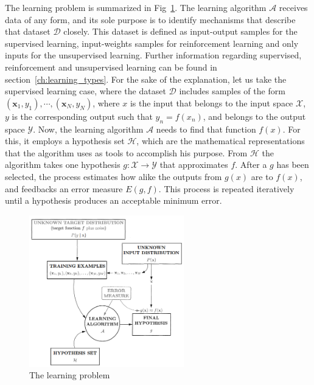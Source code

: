 The learning problem is summarized in Fig~\ref{fig:learning_problem}. The learning algorithm \( \mathcal{A} \) receives data of any form, and its sole purpose is to identify mechanisms that describe that dataset \( \mathcal{D} \) closely. This dataset is defined as input-output samples for the supervised learning, input-weights samples for reinforcement learning and only inputs for the unsupervised learning. Further information regarding supervised, reinforcement and unsupervised learning can be found in section~\ref{ch:learning_types}. For the sake of the explanation, let us take the supervised learning case, where the dataset  \( \mathcal{D} \) includes samples of the form \((\mathbf{x}_1, y_1),\cdots , (\mathbf{x}_N, y_N) \), where \(x\) is the input that belongs to the input space \( \mathcal{X} \), \(y\) is the corresponding output such that \(y_n = f(x_n)\), and belongs to the output space \( \mathcal{Y}\). Now, the learning algorithm \( \mathcal{A} \) needs to find that function \(f(x)\). For this, it employs a hypothesis set \( \mathcal{H} \), which are the mathematical representations that the algorithm uses as tools to accomplish his purpose. From \( \mathcal{H} \) the algorithm takes one hypothesis \( g:\mathcal{ X \rightarrow Y} \) that approximates \(f\). After a \(g\) has been selected, the process estimates how alike the outputs from \(g(x)\) are to \(f(x)\), and feedbacks an error measure \(E(g,f)\). This process is repeated iteratively until a hypothesis produces an acceptable minimum error. \\

\begin{figure}[htb]
    \centering
      \includegraphics[width=0.6\textwidth]{figures/learning_problem.png}
      \caption{The learning problem \cite{Yaser}}
      \label{fig:learning_problem}
\end{figure}

